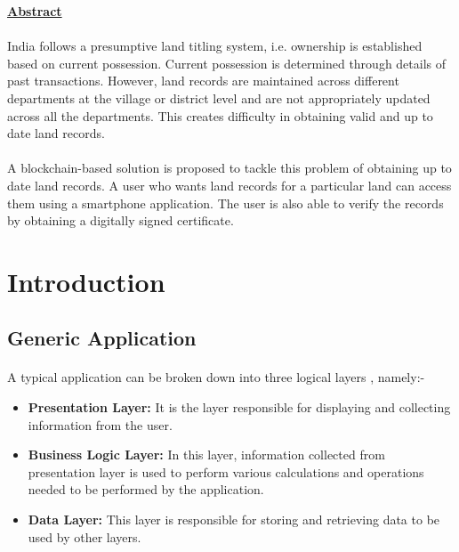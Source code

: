 \documentclass[12pt]{article}
\begin{document}
\clearpage


{
    \begin{center}
        \textbf{\underline{\large{Abstract}}}
    \end{center}

    \paragraph{}
    India follows a presumptive land titling system, i.e. ownership is established based on current possession. Current possession is determined through details of past transactions. However, land records are maintained across different departments at the village or district level and are not appropriately updated across all the departments. This creates difficulty in obtaining valid and up to date land records.
    
    \paragraph{}
    A blockchain-based solution is proposed to tackle this problem of obtaining up to date land records. A user who wants land records for a particular land can access them using a smartphone application. The user is also able to verify the records by obtaining a digitally signed certificate.

    \thispagestyle{empty}
}

\clearpage

\tableofcontents
\clearpage
{}
\listoffigures
\printglossaries
{}

\section{Introduction}
    \subsection{Generic Application}
        \paragraph{} A typical application can be broken down into three logical layers \cite{wikimulti}, namely:-
        \begin{itemize}
            \item \textbf{Presentation Layer: }It is the layer responsible for displaying and collecting information from the user.
            \item \textbf{Business Logic Layer: }In this layer, information collected from presentation layer is used to perform various calculations and operations needed to be performed by the application.
            \item \textbf{Data Layer: }This layer is responsible for storing and retrieving data to be used by other layers.
        \end{itemize}
\end{document}
